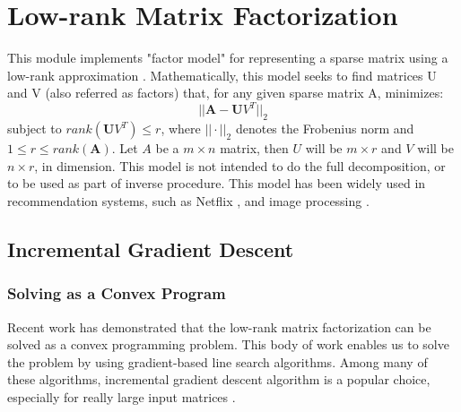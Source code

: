 
\chapter{Low-rank Matrix Factorization}

This module implements "factor model" for representing a sparse matrix
using a low-rank approximation \cite{DBLP:conf/icml/SrebroJ03}.
Mathematically, this model seeks to find matrices U and V (also referred 
as factors) that, for any given sparse matrix A, minimizes:
\[ ||\boldsymbol A - \boldsymbol UV^{T} ||_2 \]
subject to $rank(\boldsymbol UV^{T}) \leq r$, where $||\cdot||_2$ denotes
the Frobenius norm and $1 \leq r \leq rank(\boldsymbol A)$.
Let $A$ be a $m \times n$ matrix, then $U$ will be $m \times r$ and $V$
will be $n \times r$, in dimension.
This model is not intended to do the full decomposition, or to be used as
part of inverse procedure.
This model has been widely used in recommendation systems, such as Netflix
\cite{:TheNetflixPrize07}, and image processing
\cite{DBLP:conf/nips/WrightGRPM09}.

\section{Incremental Gradient Descent}

\subsection{Solving as a Convex Program}
Recent work
\cite{DBLP:journals/cacm/CandesR12, DBLP:journals/siamrev/RechtFP10}
has demonstrated that the low-rank matrix factorization can be solved as
a convex programming problem.
This body of work enables us to solve the problem by using gradient-based
line search algorithms.
Among many of these algorithms, incremental gradient descent algorithm is
a popular choice, especially for really large input matrices
\cite{DBLP:conf/sigmod/FengKRR12, DBLP:conf/kdd/GemullaNHS11}.

